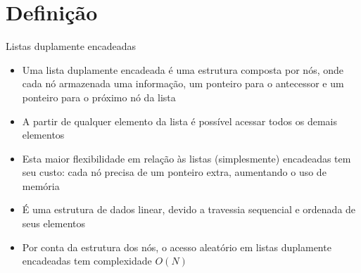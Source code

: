 \section{Definição}

\begin{frame}[fragile]{Listas duplamente encadeadas}

    \begin{itemize}
        \item Uma lista duplamente encadeada é uma estrutura composta por nós,
            onde cada nó armazenada uma informação, um ponteiro para o antecessor e um 
            ponteiro para o próximo nó da lista

        \item A partir de qualquer elemento da lista é possível acessar todos os demais elementos

        \item Esta maior flexibilidade em relação às listas (simplesmente) encadeadas tem
            seu custo: cada nó precisa de um ponteiro extra, aumentando o uso de memória

        \item É uma estrutura de dados linear, devido a travessia sequencial e ordenada
            de seus elementos

        \item Por conta da estrutura dos nós, o acesso aleatório em listas duplamente encadeadas 
            tem complexidade $O(N)$

    \end{itemize}

\end{frame}


